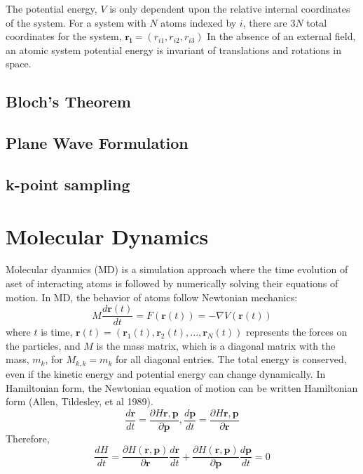 The potential energy, $V$ is only dependent upon the relative internal coordinates of the system.
For a system with $N$ atoms indexed by $i$, there are $3N$ total coordinates for the system,
	$\bm{r_{i}}=(r_{i1},r_{i2},r_{i3})$
In the absence of an external field, an atomic system potential energy is invariant of translations and rotations in space.

\subsection{Bloch's Theorem}
\subsection{Plane Wave Formulation}
\subsection{k-point sampling}
\section{Molecular Dynamics}
Molecular dyanmics (MD) is a simulation approach where the time evolution of aset of interacting atoms is followed by numerically solving their equations of motion.  In MD, the behavior of atoms follow Newtonian mechanics:
\begin{equation}
    M\frac{d\bm{r}(t)}{dt} = F(\bm{r}(t))=-\nabla V(\bm{r}(t))
\end{equation}
where $t$ is time, $\bm{r}(t) = (\bm{r}_1(t),\bm{r}_2(t),...,\bm{r}_N(t))$ represents the forces on the particles, and $M$ is the mass matrix, which is a diagonal matrix with the mass, $m_k$, for $M_{k,k}=m_k$ for all diagonal entries.
The total energy is conserved, even if the kinetic energy and potential energy can change dynamically.  In Hamiltonian form, the Newtonian equation of motion can be written Hamiltonian form (Allen, Tildesley, et al 1989).
\begin{equation}
	\frac{d \bm{r}}{dt}=\frac{\partial H{\bm{r},\bm{p}}}{\partial \bm{p}},
	\frac{d \bm{p}}{dt}=\frac{\partial H{\bm{r},\bm{p}}}{\partial \bm{r}}
\end{equation}
Therefore,
\begin{equation}
	\frac{dH}{dt}=\frac{\partial H(\bm{r},\bm{p})}{\partial \bm{r}} \frac{d\bm{r}}{dt}
						   +\frac{\partial H(\bm{r},\bm{p})}{\partial \bm{p}} \frac{d\bm{p}}{dt} = 0
\end{equation}

